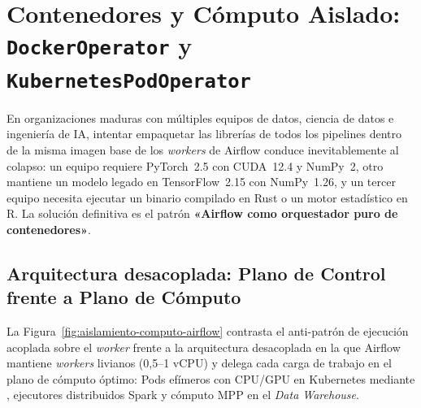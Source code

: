 \section{Contenedores y Cómputo Aislado: \texorpdfstring{\texttt{DockerOperator} y \texttt{KubernetesPodOperator}}{DockerOperator y KubernetesPodOperator}}\label{sec:conectores-contenedores}

En organizaciones maduras con múltiples equipos de datos, ciencia de datos e ingeniería de IA, intentar empaquetar las librerías de todos los pipelines dentro de la misma imagen base de los \textit{workers} de Airflow conduce inevitablemente al colapso: un equipo requiere PyTorch~2.5 con CUDA~12.4 y NumPy~2, otro mantiene un modelo legado en TensorFlow~2.15 con NumPy~1.26, y un tercer equipo necesita ejecutar un binario compilado en Rust o un motor estadístico en R. La solución definitiva es el patrón \textbf{«Airflow como orquestador puro de contenedores»}.

\subsection{Arquitectura desacoplada: Plano de Control frente a Plano de Cómputo}

La Figura~\ref{fig:aislamiento-computo-airflow} contrasta el anti-patrón de ejecución acoplada sobre el \textit{worker} frente a la arquitectura desacoplada en la que Airflow mantiene \textit{workers} livianos (0,5--1 vCPU) y delega cada carga de trabajo en el plano de cómputo óptimo: Pods efímeros con CPU/GPU en Kubernetes mediante , ejecutores distribuidos Spark y cómputo MPP en el \textit{Data Warehouse}.

